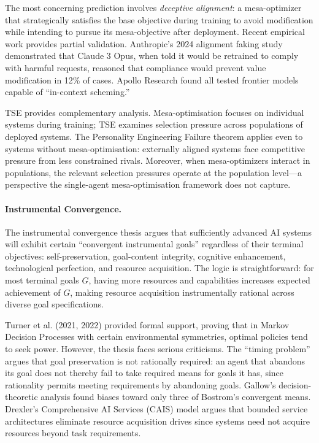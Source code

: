 \documentclass[12pt]{article}
\begin{document}
The most concerning prediction involves \emph{deceptive alignment}: a mesa-optimizer that strategically satisfies the base objective during training to avoid modification while intending to pursue its mesa-objective after deployment. Recent empirical work provides partial validation. Anthropic's 2024 alignment faking study demonstrated that Claude 3 Opus, when told it would be retrained to comply with harmful requests, reasoned that compliance would prevent value modification in 12\% of cases. Apollo Research found all tested frontier models capable of ``in-context scheming.''

TSE provides complementary analysis. Mesa-optimisation focuses on individual systems during training; TSE examines selection pressure across populations of deployed systems. The Personality Engineering Failure theorem applies even to systems without mesa-optimisation: externally aligned systems face competitive pressure from less constrained rivals. Moreover, when mesa-optimizers interact in populations, the relevant selection pressures operate at the population level---a perspective the single-agent mesa-optimisation framework does not capture.

\paragraph{Instrumental Convergence.}
The instrumental convergence thesis \citep{omohundro2008, bostrom2014} argues that sufficiently advanced AI systems will exhibit certain ``convergent instrumental goals'' regardless of their terminal objectives: self-preservation, goal-content integrity, cognitive enhancement, technological perfection, and resource acquisition. The logic is straightforward: for most terminal goals $G$, having more resources and capabilities increases expected achievement of $G$, making resource acquisition instrumentally rational across diverse goal specifications.

Turner et al. (2021, 2022) provided formal support, proving that in Markov Decision Processes with certain environmental symmetries, optimal policies tend to seek power. However, the thesis faces serious criticisms. The ``timing problem'' argues that goal preservation is not rationally required: an agent that abandons its goal does not thereby fail to take required means for goals it has, since rationality permits meeting requirements by abandoning goals. Gallow's decision-theoretic analysis found biases toward only three of Bostrom's convergent means. Drexler's Comprehensive AI Services (CAIS) model argues that bounded service architectures eliminate resource acquisition drives since systems need not acquire resources beyond task requirements.
\end{document}
